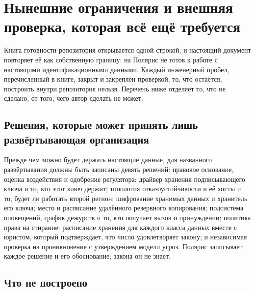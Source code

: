 \section{Нынешние ограничения и внешняя проверка, которая всё ещё требуется}
\label{sec:limitations}



Книга готовности репозитория открывается одной строкой, и настоящий документ повторяет её как
собственную границу: на  Полярис не готов к работе с настоящими
идентификационными данными. Каждый инженерный пробел, перечисленный в книге, закрыт и закреплён
проверкой; то, что остаётся, построить внутри репозитория нельзя. Перечень ниже отделяет то, что
не сделано, от того, чего автор сделать не может.

\subsection{Решения, которые может принять лишь развёртывающая организация}

Прежде чем можно будет держать настоящие данные, для названного развёртывания должны быть
записаны девять решений: правовое основание, оценка воздействия и одобрение регулятора; драйвер
хранения подписывающего ключа и то, кто этот ключ держит; топология отказоустойчивости и её хосты
и то, будет ли работать второй регион; шифрование хранимых данных и хранитель его ключа; место и
расписание удалённого резервного копирования; подсистема оповещений, график дежурств и то, кто
получает вызов о принуждении; политика права на стирание; расписание хранения для каждого класса
данных вместе с юристом, который подтверждает, что число удовлетворяет закону; и независимая
проверка на проникновение с утверждением модели угроз. Полярис записывает каждое решение и его
обоснование; закона он не знает. \sExt

\subsection{Что не построено}


